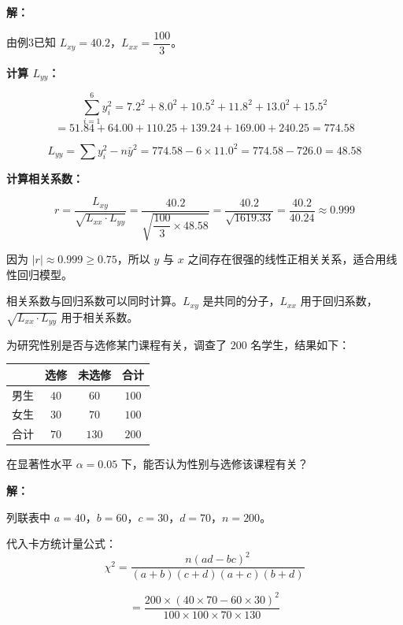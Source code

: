 \documentclass[12pt, a4paper]{ctexart}
\begin{document}
\textbf{解：}

由例3已知 $L_{xy} = 40.2$，$L_{xx} = \dfrac{100}{3}$。

\medskip
\textbf{计算 $L_{yy}$：}

\[
\sum_{i=1}^{6}y_i^2 = 7.2^2 + 8.0^2 + 10.5^2 + 11.8^2 + 13.0^2 + 15.5^2
\]
\[
= 51.84 + 64.00 + 110.25 + 139.24 + 169.00 + 240.25 = 774.58
\]

\[
L_{yy} = \sum y_i^2 - n\bar{y}^2 = 774.58 - 6 \times 11.0^2 = 774.58 - 726.0 = 48.58
\]

\medskip
\textbf{计算相关系数：}

\[
r = \frac{L_{xy}}{\sqrt{L_{xx} \cdot L_{yy}}} = \frac{40.2}{\sqrt{\dfrac{100}{3} \times 48.58}} = \frac{40.2}{\sqrt{1619.33}} = \frac{40.2}{40.24} \approx 0.999
\]

\medskip
因为 $|r| \approx 0.999 \geqslant 0.75$，所以 $y$ 与 $x$ 之间存在很强的线性正相关关系，适合用线性回归模型。

\begin{tipbox}[方法总结]
相关系数与回归系数可以同时计算。$L_{xy}$ 是共同的分子，$L_{xx}$ 用于回归系数，$\sqrt{L_{xx} \cdot L_{yy}}$ 用于相关系数。
\end{tipbox}

\bigskip

\begin{examplebox}[【例6】独立性检验的基本计算]
为研究性别是否与选修某门课程有关，调查了 $200$ 名学生，结果如下：

\begin{center}
\begin{tabular}{c|cc|c}
\toprule
 & 选修 & 未选修 & 合计 \\
\midrule
男生 & $40$ & $60$ & $100$ \\
女生 & $30$ & $70$ & $100$ \\
\midrule
合计 & $70$ & $130$ & $200$ \\
\bottomrule
\end{tabular}
\end{center}

在显著性水平 $\alpha = 0.05$ 下，能否认为性别与选修该课程有关？
\end{examplebox}

\textbf{解：}

列联表中 $a = 40$，$b = 60$，$c = 30$，$d = 70$，$n = 200$。

代入卡方统计量公式：
\[
\chi^2 = \frac{n(ad - bc)^2}{(a+b)(c+d)(a+c)(b+d)}
\]

\[
= \frac{200 \times (40\times70 - 60\times30)^2}{100 \times 100 \times 70 \times 130}
\]
\end{document}
